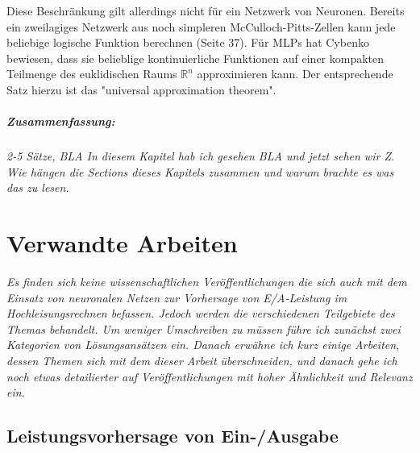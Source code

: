 \documentclass[
	12pt,
	a4paper,
	BCOR10mm,
	DIV14,
	listof=totoc,
	bibliography=totoc,
	headsepline
]{scrreprt}
\begin{document}
Diese Beschränkung gilt allerdings nicht für ein Netzwerk von Neuronen. Bereits ein zweilagiges Netzwerk aus noch simpleren McCulloch-Pitts-Zellen kann jede beliebige logische Funktion berechnen \cite{Rojas:1996:NNS:235222} (Seite 37).
Für MLPs hat Cybenko \cite{cybenko:mcss} bewiesen, dass sie belieblige kontinuierliche Funktionen auf einer kompakten Teilmenge des euklidischen Raums $\mathbb{R}^n$ approximieren kann. Der entsprechende Satz hierzu ist das "universal approximation theorem".

\bigskip
\paragraph{Zusammenfassung:}
\textit{2-5 Sätze, BLA In diesem Kapitel hab ich gesehen BLA und jetzt sehen wir Z. Wie hängen die Sections dieses Kapitels zusammen und warum brachte es was das zu lesen.}


\chapter{Verwandte Arbeiten}
\textit{%
	Es finden sich keine wissenschaftlichen Veröffentlichungen die sich auch mit dem Einsatz von neuronalen Netzen zur Vorhersage von E/A-Leistung im Hochleisungsrechnen befassen. Jedoch werden die verschiedenen Teilgebiete des Themas behandelt. Um weniger Umschreiben zu müssen führe ich zunächst zwei Kategorien von Lösungsansätzen ein. Danach erwähne ich kurz einige Arbeiten, dessen Themen sich mit dem dieser Arbeit überschneiden, und danach gehe ich noch etwas detailierter auf Veröffentlichungen mit hoher Ähnlichkeit und Relevanz ein.
}
\bigskip

\section{Leistungsvorhersage von Ein-/Ausgabe}
\end{document}
